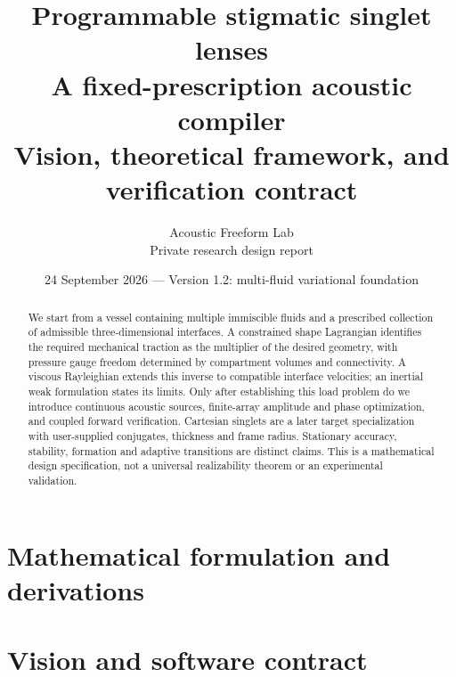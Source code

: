 \documentclass[11pt,a4paper]{article}
\title{Programmable stigmatic singlet lenses\\[0.6em]
\large A fixed-prescription acoustic compiler\\Vision, theoretical framework, and verification contract}
\author{Acoustic Freeform Lab\\\small Private research design report}
\date{24 September 2026 --- Version 1.2: multi-fluid variational foundation}
\numberwithin{equation}{section}
\begin{document}
\maketitle
\begin{abstract}
We start from a vessel containing multiple immiscible fluids and a prescribed
collection of admissible three-dimensional interfaces. A constrained shape
Lagrangian identifies the required mechanical traction as the multiplier of
the desired geometry, with pressure gauge freedom determined by compartment
volumes and connectivity. A viscous Rayleighian extends this inverse to
compatible interface velocities; an inertial weak formulation states its
limits. Only after establishing this load problem do we introduce continuous
acoustic sources, finite-array amplitude and phase optimization, and coupled
forward verification. Cartesian singlets are a later target specialization
with user-supplied conjugates, thickness and frame radius. Stationary accuracy,
stability, formation and adaptive transitions are distinct claims. This is a
mathematical design specification, not a universal realizability theorem or
an experimental validation.
\end{abstract}
\begin{center}
\end{center}
\clearpage
\tableofcontents
\clearpage
\part{Mathematical formulation and derivations}

\clearpage
\part{Vision and software contract}

\clearpage
\printbibliography[heading=bibintoc,title={Primary references}]
\end{document}
